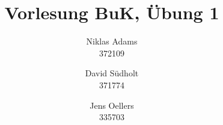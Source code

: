 \documentclass{exercisesheet}
\title{Vorlesung BuK, Übung 1}
\author{
    Niklas Adams  \\ 372109
    \and
    David S\"udholt   \\ 371774
    \and
    Jens Oellers   \\ 335703
}
\begin{document}
\maketitle
\pointtable





\end{document}
